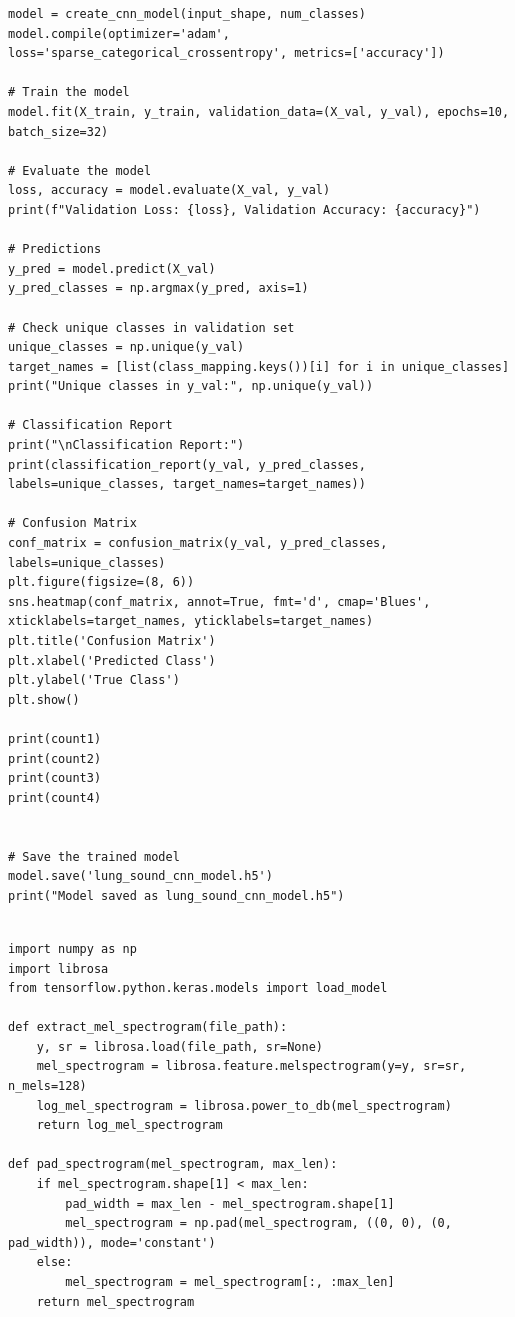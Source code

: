 \documentclass[conference]{IEEEtran}
\begin{document}
{\begin{lstlisting}[style=mypython, caption={Code for training the CNN Model}, label={lst:cnn-model_train}]
model = create_cnn_model(input_shape, num_classes)
model.compile(optimizer='adam', loss='sparse_categorical_crossentropy', metrics=['accuracy'])

# Train the model
model.fit(X_train, y_train, validation_data=(X_val, y_val), epochs=10, batch_size=32)

# Evaluate the model
loss, accuracy = model.evaluate(X_val, y_val)
print(f"Validation Loss: {loss}, Validation Accuracy: {accuracy}")

# Predictions
y_pred = model.predict(X_val)
y_pred_classes = np.argmax(y_pred, axis=1)

# Check unique classes in validation set
unique_classes = np.unique(y_val)
target_names = [list(class_mapping.keys())[i] for i in unique_classes]
print("Unique classes in y_val:", np.unique(y_val))

# Classification Report
print("\nClassification Report:")
print(classification_report(y_val, y_pred_classes, labels=unique_classes, target_names=target_names))

# Confusion Matrix
conf_matrix = confusion_matrix(y_val, y_pred_classes, labels=unique_classes)
plt.figure(figsize=(8, 6))
sns.heatmap(conf_matrix, annot=True, fmt='d', cmap='Blues', xticklabels=target_names, yticklabels=target_names)
plt.title('Confusion Matrix')
plt.xlabel('Predicted Class')
plt.ylabel('True Class')
plt.show()

print(count1)
print(count2)
print(count3)
print(count4)


# Save the trained model
model.save('lung_sound_cnn_model.h5')
print("Model saved as lung_sound_cnn_model.h5")


\end{lstlisting}

\begin{lstlisting}[style=mypython, caption={Code for using the CNN model to make predictions}, label={lst:cnn-model_predict}]
import numpy as np
import librosa
from tensorflow.python.keras.models import load_model

def extract_mel_spectrogram(file_path):
    y, sr = librosa.load(file_path, sr=None)
    mel_spectrogram = librosa.feature.melspectrogram(y=y, sr=sr, n_mels=128)
    log_mel_spectrogram = librosa.power_to_db(mel_spectrogram)
    return log_mel_spectrogram

def pad_spectrogram(mel_spectrogram, max_len):
    if mel_spectrogram.shape[1] < max_len:
        pad_width = max_len - mel_spectrogram.shape[1]
        mel_spectrogram = np.pad(mel_spectrogram, ((0, 0), (0, pad_width)), mode='constant')
    else:
        mel_spectrogram = mel_spectrogram[:, :max_len]
    return mel_spectrogram


\end{lstlisting}}
\end{document}
